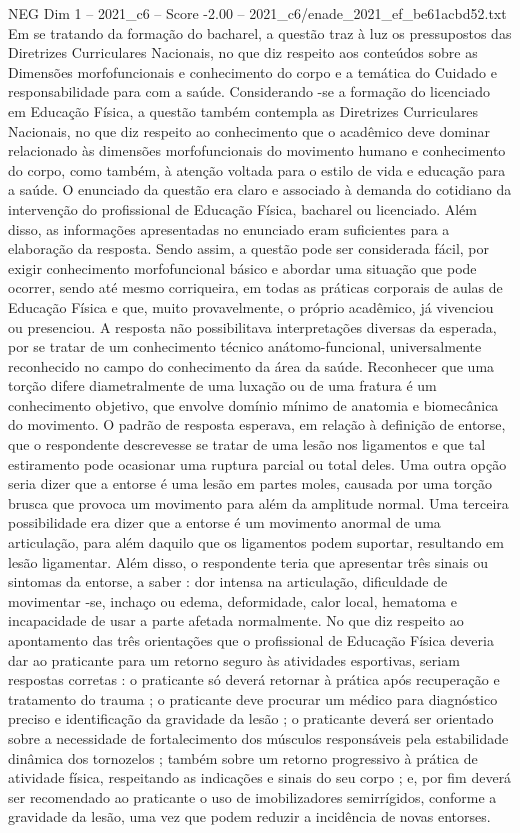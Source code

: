 \begin{textsample}{NEG Dim 1 – 2021\_c6 – Score -2.00 – 2021\_c6/enade\_2021\_ef\_be61acbd52.txt}
Em se tratando da formação do bacharel, a questão traz à luz os pressupostos das Diretrizes Curriculares Nacionais, no que diz respeito aos conteúdos sobre as Dimensões morfofuncionais e conhecimento do corpo e a temática do Cuidado e responsabilidade para com a saúde.
Considerando -se a formação do licenciado em Educação Física, a questão também contempla as Diretrizes Curriculares Nacionais, no que diz respeito ao conhecimento que o acadêmico deve dominar relacionado às dimensões morfofuncionais do movimento humano e conhecimento do corpo, como também, à atenção voltada para o estilo de vida e educação para a saúde.
O enunciado da questão era claro e associado à demanda do cotidiano da intervenção do profissional de Educação Física, bacharel ou licenciado.
Além disso, as informações apresentadas no enunciado eram suficientes para a elaboração da resposta.
Sendo assim, a questão pode ser considerada fácil, por exigir conhecimento morfofuncional básico e abordar uma situação que pode ocorrer, sendo até mesmo corriqueira, em todas as práticas corporais de aulas de Educação Física e que, muito provavelmente, o próprio acadêmico, já vivenciou ou presenciou.
A resposta não possibilitava interpretações diversas da esperada, por se tratar de um conhecimento técnico anátomo-funcional, universalmente reconhecido no campo do conhecimento da área da saúde.
Reconhecer que uma torção difere diametralmente de uma luxação ou de uma fratura é um conhecimento objetivo, que envolve domínio mínimo de anatomia e biomecânica do movimento.
O padrão de resposta esperava, em relação à definição de entorse, que o respondente descrevesse se tratar de uma lesão nos ligamentos e que tal estiramento pode ocasionar uma ruptura parcial ou total deles.
Uma outra opção seria dizer que a entorse é uma lesão em partes moles, causada por uma torção brusca que provoca um movimento para além da amplitude normal.
Uma terceira possibilidade era dizer que a entorse é um movimento anormal de uma articulação, para além daquilo que os ligamentos podem suportar, resultando em lesão ligamentar.
Além disso, o respondente teria que apresentar três sinais ou sintomas da entorse, a saber : dor intensa na articulação, dificuldade de movimentar -se, inchaço ou edema, deformidade, calor local, hematoma e incapacidade de usar a parte afetada normalmente.
No que diz respeito ao apontamento das três orientações que o profissional de Educação Física deveria dar ao praticante para um retorno seguro às atividades esportivas, seriam respostas corretas : o praticante só deverá retornar à prática após recuperação e tratamento do trauma ; o praticante deve procurar um médico para diagnóstico preciso e identificação da gravidade da lesão ; o praticante deverá ser orientado sobre a necessidade de fortalecimento dos músculos responsáveis pela estabilidade dinâmica dos tornozelos ; também sobre um retorno progressivo à prática de atividade física, respeitando as indicações e sinais do seu corpo ; e, por fim deverá ser recomendado ao praticante o uso de imobilizadores semirrígidos, conforme a gravidade da lesão, uma vez que podem reduzir a incidência de novas entorses.

\end{textsample}
